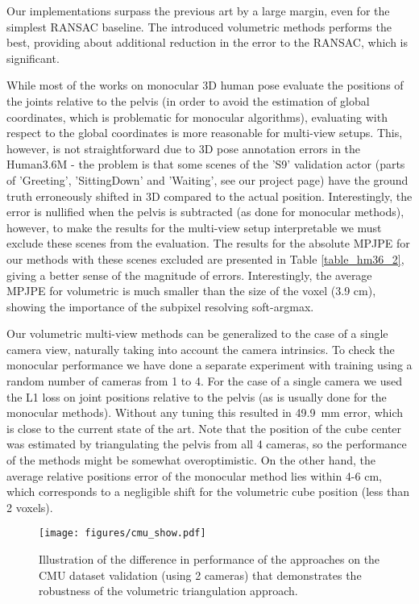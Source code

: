 \documentclass[10pt,twocolumn,letterpaper]{article}
\begin{document}
Our implementations surpass the previous art by a large margin, even for the simplest RANSAC baseline. The introduced volumetric methods performs the best, providing about  additional reduction in the error to the RANSAC, which is significant. 

While most of the works on monocular 3D human pose evaluate the positions of the joints relative to the pelvis (in order to avoid the estimation of global coordinates, which is problematic for monocular algorithms), evaluating with respect to the global coordinates is more reasonable for multi-view setups. This, however, is not straightforward due to 3D pose annotation errors in the Human3.6M - the problem is that some scenes of the 'S9' validation actor (parts of 'Greeting', 'SittingDown' and 'Waiting', see our project page) have the ground truth erroneously shifted in 3D compared to the actual position. Interestingly, the error is nullified when the pelvis is subtracted (as done for monocular methods), however, to make the results for the multi-view setup interpretable we must exclude these scenes from the evaluation. The results for the absolute MPJPE for our methods with these scenes excluded are presented in Table \ref{table_hm36_2}, giving a better sense of the magnitude of errors. Interestingly, the average MPJPE for volumetric is much smaller than the size of the voxel (3.9 cm), showing the importance of the subpixel resolving soft-argmax.

Our volumetric multi-view methods can be generalized to the case of a single camera view, naturally taking into account the camera intrinsics. To check the monocular performance we have done a separate experiment with training using a random number of cameras from 1 to 4. For the case of a single camera we used the L1 loss on joint positions relative to the pelvis (as is usually done for the monocular methods). Without any tuning this resulted in 49.9~mm error, which is close to the current state of the art. Note that the position of the cube center was estimated by triangulating the pelvis from all 4 cameras, so the performance of the methods might be somewhat overoptimistic. On the other hand, the average relative positions error of the monocular method lies within 4-6 cm, which corresponds to a negligible shift for the volumetric cube position (less than 2 voxels).



\begin{figure*}

    \centering
    \texttt{[image: figures/cmu\_show.pdf]}
    \caption{Illustration of the difference in performance of the approaches on the CMU dataset validation (using 2 cameras) that demonstrates the robustness of the volumetric triangulation approach.}
    \label{fig:cmu_show}
    
\end{figure*}
\end{document}
